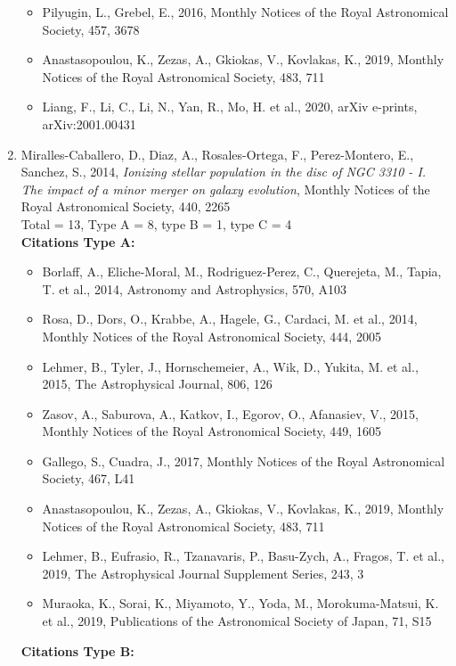 \documentclass{letter}
\begin{document}
\begin{enumerate}
\begin{itemize}
\item Pilyugin, L., Grebel, E., 2016, Monthly Notices of the Royal Astronomical Society, 457, 3678
\item Anastasopoulou, K., Zezas, A., Gkiokas, V., Kovlakas, K., 2019, Monthly Notices of the Royal Astronomical Society, 483, 711
\item Liang, F., Li, C., Li, N., Yan, R., Mo, H. et al., 2020, arXiv e-prints, arXiv:2001.00431
\end{itemize}
\item Miralles-Caballero, D., Diaz, A., Rosales-Ortega, F., Perez-Montero, E., Sanchez, S., 2014, {\it Ionizing stellar population in the disc of NGC 3310 - I. The impact of a minor merger on galaxy evolution}, Monthly Notices of the Royal Astronomical Society, 440, 2265 \\ 
Total = 13, Type A = 8, type B = 1, type C = 4 \\ 
{\bf Citations Type A:}
\begin{itemize}
\item Borlaff, A., Eliche-Moral, M., Rodriguez-Perez, C., Querejeta, M., Tapia, T. et al., 2014, Astronomy and Astrophysics, 570, A103
\item Rosa, D., Dors, O., Krabbe, A., Hagele, G., Cardaci, M. et al., 2014, Monthly Notices of the Royal Astronomical Society, 444, 2005
\item Lehmer, B., Tyler, J., Hornschemeier, A., Wik, D., Yukita, M. et al., 2015, The Astrophysical Journal, 806, 126
\item Zasov, A., Saburova, A., Katkov, I., Egorov, O., Afanasiev, V., 2015, Monthly Notices of the Royal Astronomical Society, 449, 1605
\item Gallego, S., Cuadra, J., 2017, Monthly Notices of the Royal Astronomical Society, 467, L41
\item Anastasopoulou, K., Zezas, A., Gkiokas, V., Kovlakas, K., 2019, Monthly Notices of the Royal Astronomical Society, 483, 711
\item Lehmer, B., Eufrasio, R., Tzanavaris, P., Basu-Zych, A., Fragos, T. et al., 2019, The Astrophysical Journal Supplement Series, 243, 3
\item Muraoka, K., Sorai, K., Miyamoto, Y., Yoda, M., Morokuma-Matsui, K. et al., 2019, Publications of the Astronomical Society of Japan, 71, S15
\end{itemize}
{\bf Citations Type B:}
\begin{itemize}

\end{itemize}
\end{enumerate}
\end{document}
